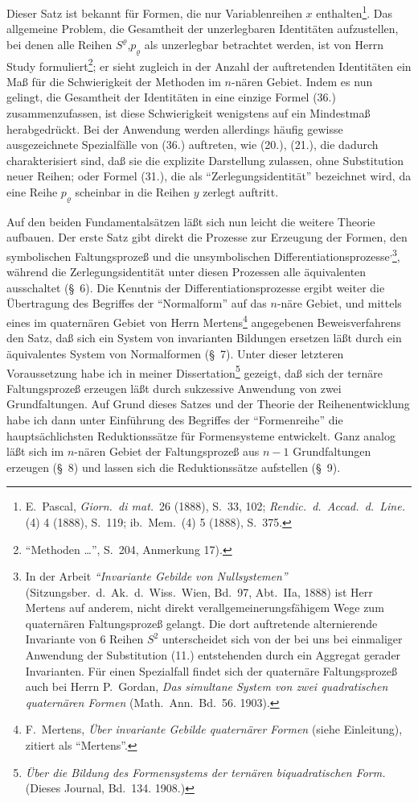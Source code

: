 \documentclass[12pt,a4paper]{article}
\begin{document}
Dieser Satz ist bekannt für Formen, die nur Variablenreihen $x$ enthalten\footnote{E.\ Pascal, \textit{Giorn.\ di mat.}\ 26 (1888), S.~33, 102; \textit{Rendic.\ d.\ Accad.\ d.\ Line.} (4) 4 (1888), S.~119; ib.\ Mem.\ (4) 5 (1888), S.~375.}. Das allgemeine Problem, die Gesamtheit der unzerlegbaren Identitäten aufzustellen, bei denen alle Reihen $S^{\varrho}$,$p_{\varrho}$ als unzerlegbar betrachtet werden, ist von Herrn Study formuliert\footnote{``Methoden \ldots'', S.~204, Anmerkung 17).}; er sieht zugleich in der Anzahl der auftretenden Identitäten ein Maß für die Schwierigkeit der Methoden im $n$-nären Gebiet. Indem es nun gelingt, die Gesamtheit der Identitäten in eine einzige Formel (36.) zusammenzufassen, ist diese Schwierigkeit wenigstens auf ein Mindestmaß herabgedrückt. Bei der Anwendung werden allerdings häufig gewisse ausgezeichnete Spezialfälle von (36.) auftreten, wie (20.), (21.), die dadurch charakterisiert sind, daß sie die explizite Darstellung zulassen, ohne Substitution neuer Reihen; oder Formel (31.), die als ``Zerlegungsidentität'' bezeichnet wird, da eine Reihe $p_{\varrho}$ scheinbar in die Reihen $y$ zerlegt auftritt.

Auf den beiden Fundamentalsätzen läßt sich nun leicht die weitere Theorie aufbauen. Der erste Satz gibt direkt die Prozesse zur Erzeugung der Formen, den symbolischen Faltungsprozeß und die unsymbolischen Differentiationsprozesse\textsuperscript{,}\footnote{In der Arbeit \textit{``Invariante Gebilde von Nullsystemen''} (Sitzungsber.\ d.\ Ak.\ d.\ Wiss.\ Wien, Bd.~97, Abt.\ IIa, 1888) ist Herr Mertens auf anderem, nicht direkt verallgemeinerungsfähigem Wege zum quaternären Faltungsprozeß gelangt. Die dort auftretende alternierende Invariante von 6 Reihen $S^{2}$ unterscheidet sich von der bei uns bei einmaliger Anwendung der Substitution (11.) entstehenden durch ein Aggregat gerader Invarianten. Für einen Spezialfall findet sich der quaternäre Faltungsprozeß auch bei Herrn P.\ Gordan, \textit{Das simultane System von zwei quadratischen quaternären Formen} (Math.\ Ann.\ Bd.~56. 1903).}, während die Zerlegungsidentität unter diesen Prozessen alle äquivalenten ausschaltet (\S\ 6). Die Kenntnis der Differentiationsprozesse ergibt weiter die Übertragung des Begriffes der ``Normalform'' auf das $n$-näre Gebiet, und mittels eines im quaternären Gebiet von Herrn Mertens\footnote{F.\ Mertens, \textit{Über invariante Gebilde quaternärer Formen} (siehe Einleitung), zitiert als ``Mertens''.} angegebenen Beweisverfahrens den Satz, daß sich ein System von invarianten Bildungen ersetzen läßt durch ein äquivalentes System von Normalformen (\S\ 7). Unter dieser letzteren Voraussetzung habe ich in meiner Dissertation\footnote{\textit{Über die Bildung des Formensystems der ternären biquadratischen Form.} (Dieses Journal, Bd.~134. 1908.)} gezeigt, daß sich der ternäre Faltungsprozeß erzeugen läßt durch sukzessive Anwendung von zwei Grundfaltungen. Auf Grund dieses Satzes und der Theorie der Reihenentwicklung habe ich dann unter Einführung des Begriffes der ``Formenreihe'' die hauptsächlichsten Reduktionssätze für Formensysteme entwickelt. Ganz analog läßt sich im $n$-nären Gebiet der Faltungsprozeß aus $n-1$ Grundfaltungen erzeugen (\S\ 8) und lassen sich die Reduktionssätze aufstellen (\S\ 9).
\end{document}
